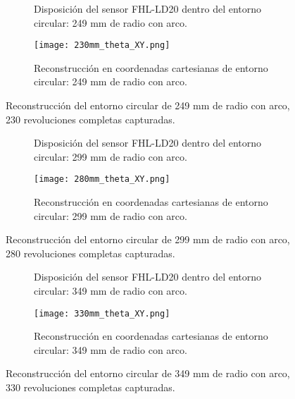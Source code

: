 \begin{figure}[H]
	\centering
	\begin{subfigure}{0.45\textwidth}
		\centering
		\caption{Disposición del sensor FHL-LD20 dentro del entorno circular: 249 mm de radio con arco.}
		\label{fig:disposicion_lidar_theta3}
	\end{subfigure}
	\hspace{1em}
	\begin{subfigure}{0.45\textwidth}
		\centering
		\texttt{[image: 230mm\_theta\_XY.png]}
		\caption{Reconstrucción en coordenadas cartesianas de entorno circular: 249 mm de radio con arco.}
		\label{fig:249m_radius_xy_theta3}
	\end{subfigure}
	\caption{Reconstrucción del entorno circular de 249 mm de radio con arco, 230 revoluciones completas capturadas.}
	\label{fig:disposicion_lidar_var_theta3}
\end{figure}


\begin{figure}[H]
	\centering
	\begin{subfigure}{0.45\textwidth}
		\centering
		\caption{Disposición del sensor FHL-LD20 dentro del entorno circular: 299 mm de radio con arco.}
		\label{fig:disposicion_lidar_theta4}
	\end{subfigure}
	\hspace{1em}
	\begin{subfigure}{0.45\textwidth}
		\centering
		\texttt{[image: 280mm\_theta\_XY.png]}
		\caption{Reconstrucción en coordenadas cartesianas de entorno circular: 299 mm de radio con arco.}
		\label{fig:299m_radius_xy_theta4}
	\end{subfigure}
	\caption{Reconstrucción del entorno circular de 299 mm de radio con arco, 280 revoluciones completas capturadas.}
	\label{fig:disposicion_lidar_var_theta4}
\end{figure}


\begin{figure}[H]
	\centering
	\begin{subfigure}{0.45\textwidth}
		\centering
		\caption{Disposición del sensor FHL-LD20 dentro del entorno circular: 349 mm de radio con arco.}
		\label{fig:disposicion_lidar_theta5}
	\end{subfigure}
	\hspace{1em}
	\begin{subfigure}{0.45\textwidth}
		\centering
		\texttt{[image: 330mm\_theta\_XY.png]}
		\caption{Reconstrucción en coordenadas cartesianas de entorno circular: 349 mm de radio con arco.}
		\label{fig:349m_radius_xy_theta5}
	\end{subfigure}
	\caption{Reconstrucción del entorno circular de 349 mm de radio con arco, 330 revoluciones completas capturadas.}
	\label{fig:disposicion_lidar_var_theta5}
\end{figure}


